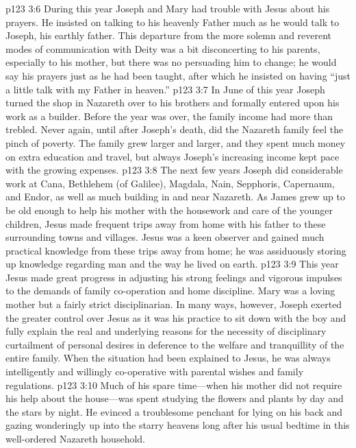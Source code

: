 \pc \vs p123 3:6 During this year Joseph and Mary had trouble with Jesus about his prayers. He insisted on talking to his heavenly Father much as he would talk to Joseph, his earthly father. This departure from the more solemn and reverent modes of communication with Deity was a bit disconcerting to his parents, especially to his mother, but there was no persuading him to change; he would say his prayers just as he had been taught, after which he insisted on having \textcolor{ubdarkred}{“just a little talk with my Father in heaven.”}
\vs p123 3:7 In June of this year Joseph turned the shop in Nazareth over to his brothers and formally entered upon his work as a builder. Before the year was over, the family income had more than trebled. Never again, until after Joseph’s death, did the Nazareth family feel the pinch of poverty. The family grew larger and larger, and they spent much money on extra education and travel, but always Joseph’s increasing income kept pace with the growing expenses.
\vs p123 3:8 The next few years Joseph did considerable work at Cana, Bethlehem (of Galilee), Magdala, Nain, Sepphoris, Capernaum, and Endor, as well as much building in and near Nazareth. As James grew up to be old enough to help his mother with the housework and care of the younger children, Jesus made frequent trips away from home with his father to these surrounding towns and villages. Jesus was a keen observer and gained much practical knowledge from these trips away from home; he was assiduously storing up knowledge regarding man and the way he lived on earth.
\pc \vs p123 3:9 This year Jesus made great progress in adjusting his strong feelings and vigorous impulses to the demands of family co\hyp{}operation and home discipline. Mary was a loving mother but a fairly strict disciplinarian. In many ways, however, Joseph exerted the greater control over Jesus as it was his practice to sit down with the boy and fully explain the real and underlying reasons for the necessity of disciplinary curtailment of personal desires in deference to the welfare and tranquillity of the entire family. When the situation had been explained to Jesus, he was always intelligently and willingly co\hyp{}operative with parental wishes and family regulations.
\pc \vs p123 3:10 Much of his spare time---when his mother did not require his help about the house---was spent studying the flowers and plants by day and the stars by night. He evinced a troublesome penchant for lying on his back and gazing wonderingly up into the starry heavens long after his usual bedtime in this well\hyp{}ordered Nazareth household.
